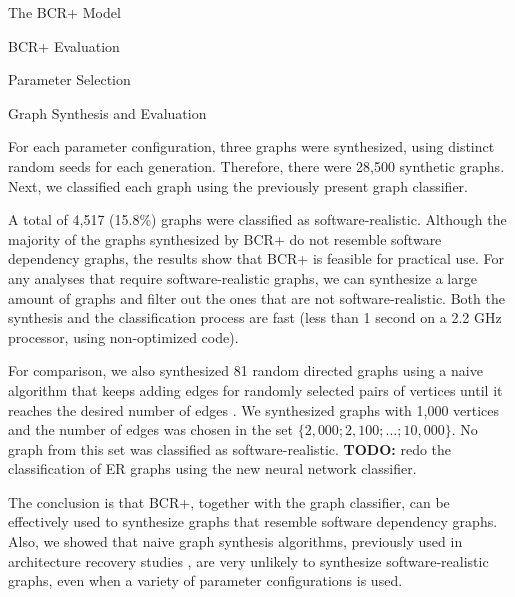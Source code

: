 \documentclass[11pt,twocolumn,a4paper,english]{article}
\newcommand{\TODO}{\textbf{TODO:} }
\begin{document}
\begin{section}{The BCR+ Model}
\begin{subsection}{BCR+ Evaluation}
\begin{subsubsection}{Parameter Selection}
\end{subsubsection}

\begin{subsubsection}{Graph Synthesis and Evaluation}
	
	For each parameter configuration, three graphs were synthesized, using distinct random seeds for each generation. Therefore, there were 28,500 synthetic graphs. Next, we classified each graph using the previously present graph classifier.

	
	A total of 4,517 (15.8\%) graphs were classified as software-realistic. Although the majority of the graphs synthesized by BCR+ do not resemble software dependency graphs, the results show that BCR+ is feasible for practical use. For any analyses that require software-realistic graphs, we can synthesize a large amount of graphs and filter out the ones that are not software-realistic. Both the synthesis and the classification process are fast (less than 1 second on a 2.2 GHz processor, using non-optimized code).

	For comparison, we also synthesized 81 random directed graphs using a naive algorithm that keeps adding edges for randomly selected pairs of vertices until it reaches the desired number of edges \cite{Erdos1959}. We synthesized graphs with 1,000 vertices and the number of edges was chosen in the set $\{2,000; 2,100; \ldots ; 10,000\}$. No graph from this set was classified as software-realistic. \TODO redo the classification of ER graphs using the new neural network classifier.

	The conclusion is that BCR+, together with the graph classifier, can be effectively used to synthesize graphs that resemble software dependency graphs. Also, we showed that naive graph synthesis algorithms, previously used in architecture recovery studies \cite{Mitchell2007}, are very unlikely to synthesize software-realistic graphs, even when a variety of parameter configurations is used.
	
	
	
\end{subsubsection}

\end{subsection}	
\end{section}
\end{document}
